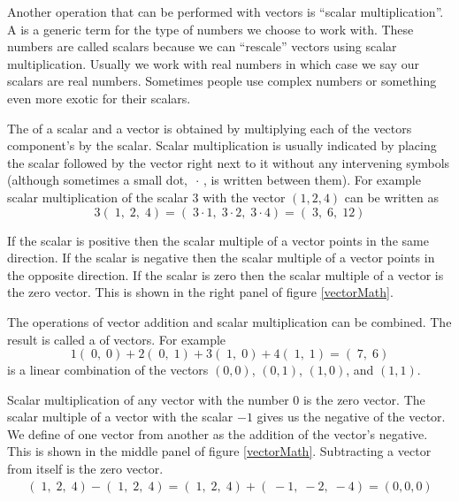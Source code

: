    Another operation that can be performed with vectors is ``scalar 
multiplication''. A  is a generic term for the type of
numbers we choose to work with. These numbers are called scalars because we 
can ``rescale'' vectors using scalar multiplication. Usually we work with real 
numbers in which case we say our scalars are real numbers. Sometimes people 
use complex numbers or something even more exotic for their scalars. 

   The  of a scalar and a vector is obtained by
multiplying each of the vectors component's by the scalar. Scalar 
multiplication is usually indicated by placing the scalar followed by the 
vector right next to it without any intervening symbols (although sometimes a 
small dot, $\, \cdot\, $, is written between them). For example scalar 
multiplication of the scalar $3$ with the vector $( 1, 2, 4)$ can be written as
\begin{equation*}
3(\; 1, \; 2, \; 4) = (\; 3 \cdot 1, \; 3 \cdot 2, \; 3 \cdot 4) 
= (\; 3,\; 6, \; 12)
\end{equation*}

   If the scalar is positive then the scalar multiple of a vector points in the 
same direction. If the scalar is negative then the scalar multiple of a vector 
points in the opposite direction. If the scalar is zero then the scalar 
multiple of a vector is the zero vector. This is shown in the right panel of 
figure \ref{vectorMath}. 

   The operations of vector addition and scalar multiplication can be combined.
The result is called a  of vectors. For example
\begin{equation*}
  1 (\; 0,\; 0) + 2 (\; 0,\; 1) + 3 (\; 1,\; 0) + 4 (\; 1,\; 1) =  (\; 7,\; 6)
\end{equation*}
is a linear combination of the vectors $(0,0)$, $(0,1)$, $(1,0)$, and $(1,1)$.

   Scalar multiplication of any vector with the number $0$ is the zero vector.
The scalar multiple of a vector with the scalar $-1$ gives us the negative
of the vector. We define  of one vector from 
another as the addition of the vector's negative. This is shown in the 
middle panel of figure \ref{vectorMath}. Subtracting a vector from itself is 
the zero vector.
\begin{eqnarray*}
  (\; 1, \; 2, \; 4) - (\; 1, \; 2, \; 4) = 
  (\; 1, \; 2, \; 4) + (\; -1, \; -2, \; -4) = (0,0,0)
\end{eqnarray*}

